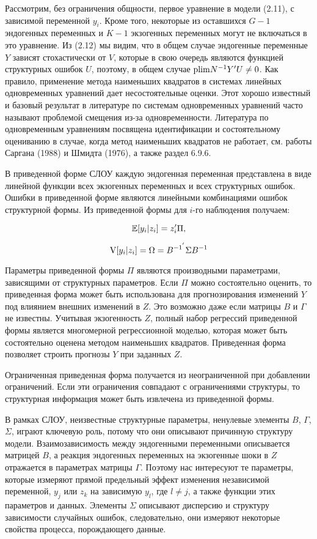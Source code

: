 	
Рассмотрим, без ограничения общности, первое уравнение в модели (2.11), с зависимой переменной $y_{i}$. Кроме того, некоторые из оставшихся $G-1$ эндогенных переменных и $K-1$ экзогенных переменных могут не включаться в это уравнение. 
Из (2.12) мы видим, что в общем случае эндогенные переменные $Y$ зависят стохастически от $V$, которые в свою очередь являются функцией структурных ошибок $U$, поэтому, в общем  случае $\mathrm{plim } N^{-1}Y'U\neq 0$. Как правило, применение метода наименьших квадратов в системах линейных одновременных уравнений дает несостоятельные оценки. Этот хорошо известный и базовый результат в литературе по системам одновременных уравнений часто называют проблемой смещения из-за одновременности. Литература по одновременным уравнениям посвящена идентификации и состоятельному оцениванию в случае, когда  метод наименьших квадратов не работает, см. работы Саргана (1988) и Шмидта (1976), а также раздел 6.9.6. 
	
	
В приведенной форме СЛОУ  каждую эндогенная переменная представлена в виде линейной функции всех экзогенных переменных и всех структурных ошибок. Ошибки в приведенной форме являются линейными комбинациями ошибок структурной формы. Из приведенной формы для $i$-го наблюдения получаем:

\begin{equation}
\mathbb{E}[y_{i}|z_{i}]=z'_{i}\Pi,
\end{equation}

\begin{equation}
\mathrm{V}[y_{i}|z_{i}]=\Omega=B^{-1^{'}} \Sigma B^{-1}
\end{equation}
 
 
Параметры приведенной формы $\Pi$ являются производными параметрами, зависящими от структурных параметров. Если $\Pi$  можно состоятельно оценить, то приведенная форма может быть использована для прогнозирования изменений $Y$ под влиянием внешних изменений в $Z$. Это возможно даже если матрицы $B$ и $\Gamma$ не известны. Учитывая экзогенность $Z$, полный набор регрессий приведенной формы является многомерной регрессионной моделью, которая может быть состоятельно оценена методом наименьших квадратов. Приведенная форма позволяет строить прогнозы $Y$ при заданных $Z$. 


Ограниченная приведенная форма получается из неограниченной при добавлении ограничений. Если эти ограничения совпадают с ограничениями структуры, то структурная информация может быть извлечена из приведенной формы. 
	
	
В рамках СЛОУ, неизвестные структурные параметры, ненулевые элементы $B$, $\Gamma$, $\Sigma$, играют ключевую роль, потому что они описывают причинную структуру модели. Взаимозависимость между эндогенными переменными описывается матрицей $B$, а реакция эндогенных переменных на экзогенные шоки в $Z$ отражается в параметрах матрицы $\Gamma$. Поэтому нас интересуют те параметры, которые измеряют прямой предельный эффект изменения независимой переменной, $y_{j}$ или $z_{k}$ на зависимую $y_{l}$, где $l\neq j$, а также функции этих параметров и данных. Элементы $\Sigma$ описывают дисперсию и структуру зависимости случайных ошибок, следовательно, они измеряют некоторые свойства процесса, порождающего данные. 
	

